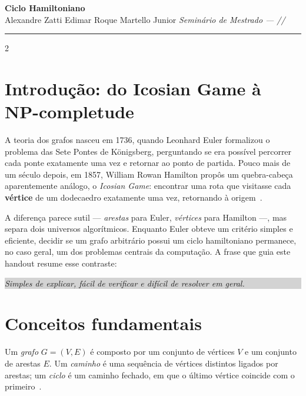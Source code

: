 \documentclass[10pt,a4paper]{article}
\theoremstyle{definition}
\newcommand{\guidebox}[1]{%
  \smallskip
  \noindent\colorbox{lightgray}{\parbox{\linewidth-2\fboxsep}{\small #1}}
  \smallskip
}
\begin{document}
\begin{center}
  {\Large\textbf{\textcolor{mainblue}{Ciclo Hamiltoniano}}}\\[2pt]
  {\small Alexandre Zatti \textbullet{} Edimar Roque Martello Junior \hspace{0.6em} \textit{Seminário de Mestrado --- \the\day/\the\month/\the\year}}
\end{center}
\vspace{-4pt}
\noindent\rule{\linewidth}{0.8pt}
\vspace{4pt}

\begin{multicols}{2}

\section{Introdução: do Icosian Game à NP-completude}

A teoria dos grafos nasceu em 1736, quando Leonhard Euler formalizou o problema das Sete Pontes de Königsberg, perguntando se era possível percorrer cada ponte exatamente uma vez e retornar ao ponto de partida. Pouco mais de um século depois, em 1857, William Rowan Hamilton propôs um quebra-cabeça aparentemente análogo, o \emph{Icosian Game}: encontrar uma rota que visitasse cada \textbf{vértice} de um dodecaedro exatamente uma vez, retornando à origem~\citep{hamilton1856}.

A diferença parece sutil --- \emph{arestas} para Euler, \emph{vértices} para Hamilton ---, mas separa dois universos algorítmicos. Enquanto Euler obteve um critério simples e eficiente, decidir se um grafo arbitrário possui um ciclo hamiltoniano permanece, no caso geral, um dos problemas centrais da computação. A frase que guia este handout resume esse contraste:

\guidebox{\textit{Simples de explicar, fácil de verificar e difícil de resolver em geral.}}

\section{Conceitos fundamentais}

Um \emph{grafo} $G = (V, E)$ é composto por um conjunto de vértices $V$ e um conjunto de arestas $E$. Um \emph{caminho} é uma sequência de vértices distintos ligados por arestas; um \emph{ciclo} é um caminho fechado, em que o último vértice coincide com o primeiro~\citep{cormen2012}.


\end{multicols}
\end{document}
